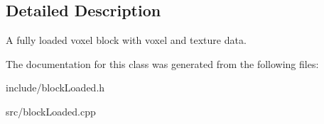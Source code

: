 \subsection{\-Detailed \-Description}
\-A fully loaded voxel block with voxel and texture data. 

\-The documentation for this class was generated from the following files\-:\begin{DoxyCompactItemize}
\item 
include/block\-Loaded.\-h\item 
src/block\-Loaded.\-cpp\end{DoxyCompactItemize}
